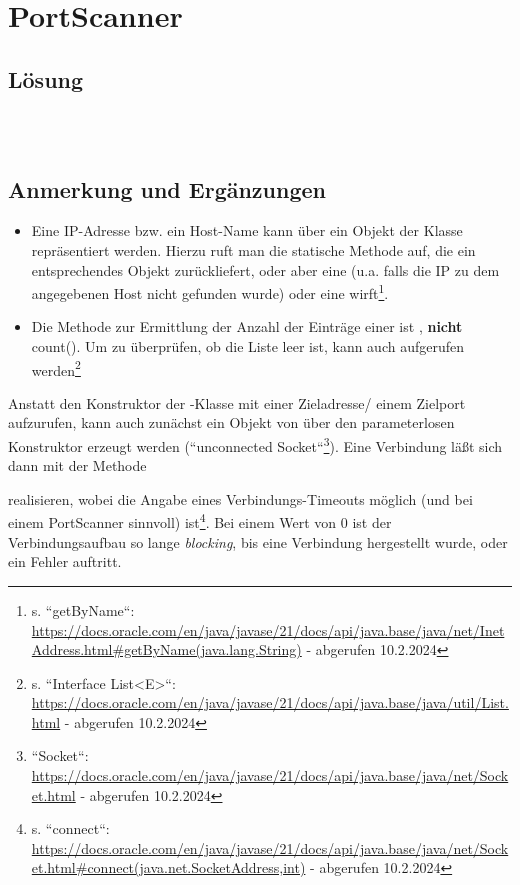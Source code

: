 \section{PortScanner}\label{ch:portscanner}


\subsection{Lösung}

\begin{verbatim}

\end{verbatim}\\


\subsection{Anmerkung und Ergänzungen}



\begin{itemize}
    \item Eine IP-Adresse bzw. ein Host-Name kann über ein Objekt der Klasse  repräsentiert werden.
    Hierzu ruft man die statische Methode  auf, die ein entsprechendes Objekt zurückliefert,
    oder aber eine  (u.a. falls die IP zu dem angegebenen Host nicht gefunden wurde) oder eine  wirft\footnote{
    s. ``getByName``: \url{https://docs.oracle.com/en/java/javase/21/docs/api/java.base/java/net/InetAddress.html#getByName(java.lang.String)} - abgerufen 10.2.2024
    }.
    \item Die Methode zur Ermittlung der Anzahl der Einträge einer  ist , \textbf{nicht} count().
    Um zu überprüfen, ob die Liste leer ist, kann auch  aufgerufen werden\footnote{
    s. ``Interface List<E>``: \url{https://docs.oracle.com/en/java/javase/21/docs/api/java.base/java/util/List.html} - abgerufen 10.2.2024
    }
    \end{itemize}

\noindent
Anstatt den Konstruktor der -Klasse mit einer Zieladresse/ einem Zielport aufzurufen, kann auch zunächst ein Objekt von  über den parameterlosen Konstruktor erzeugt werden (``unconnected Socket``\footnote {
    ``Socket``: \url{https://docs.oracle.com/en/java/javase/21/docs/api/java.base/java/net/Socket.html} - abgerufen 10.2.2024
}).
Eine Verbindung läßt sich dann mit der Methode \begin{center}\end{center} realisieren, wobei die Angabe eines Verbindungs-Timeouts möglich (und bei einem PortScanner sinnvoll) ist\footnote{
    s. ``connect``: \url{https://docs.oracle.com/en/java/javase/21/docs/api/java.base/java/net/Socket.html#connect(java.net.SocketAddress,int)} - abgerufen 10.2.2024
}.
Bei einem Wert von $0$ ist der Verbindungsaufbau so lange \textit{blocking}, bis eine Verbindung hergestellt wurde, oder ein Fehler auftritt.

